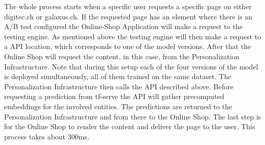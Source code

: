 The whole process starts when a specific user requests a specific page on either digitec.ch or galaxus.ch.
If the requested page has an element where there is an A/B test configured the Online-Shop Application will make a request to the testing engine.
As mentioned above the testing engine will then make a request to a API location, which corresponds to one of the model versions.
After that the Online Shop will request the content, in this case, from the Personalization Infrastructure.
Note that during this setup each of the four versions of the model is deployed simultaneously, all of them trained on the same dataset.
The Personalization Infrastructure then calls the API described above.
Before requesting a prediction from tf-serve the API will gather precomputed embeddings for the involved entities.
The predictions are returned to the Personalization Infrastructure and from there to the Online Shop.
The last step is for the Online Shop to render the content and deliver the page to the user.
This process takes about 300ms.